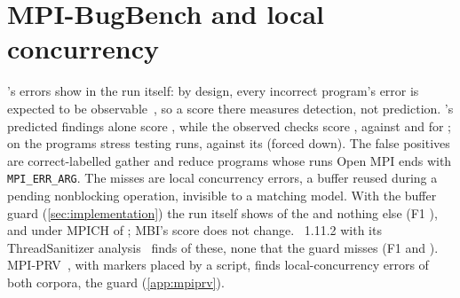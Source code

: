 \section{MPI-BugBench and local concurrency}
\label{app:mbb}

\MBB's errors show in the run itself: by design, every incorrect program's error is
expected to be observable~\citep{jammer24quality}, so a score there measures detection, not
prediction. \tool's predicted findings alone score \MBBfonepredicted, while the observed checks
score \MBBfoneunion, against \MBBfoneMUST and \MBBfoneMUSTsym for \MUST; on the \nMBBStressProgs
programs stress testing runs, \MBBfoneunionstress against its \MBBfonestress
(\MBBfonestresseager forced down). The \nMBBfp false
positives are
correct-labelled gather and reduce programs whose runs Open MPI ends with \texttt{MPI\_ERR\_ARG}. The \nMBBfnunion misses are local
concurrency errors, a buffer reused during a pending nonblocking operation, invisible to a matching
model. With the buffer guard (\cref{sec:implementation}) the run
itself shows \nMBBLCguard of the \nMBBLC and nothing else (F1 \MBBfoneguard), and under MPICH
\nGuardLCMPICHfound of \nGuardLCMPICHbuilt; MBI's score does not change. \MUST~1.11.2 with its
ThreadSanitizer analysis~\citep{jenke23tsanfibers} finds \nTsanLCfound of these, none that the
guard misses (F1 \MBBfoneMUSTeleventsan and \MBBfoneMUSTeleventsansym). MPI-PRV~\citep{yao26mpiprv},
with markers placed by a script, finds
\nPRVtpBLC local-concurrency errors of both corpora, the guard \nPRVtpStrettoLC (\cref{app:mpiprv}).


